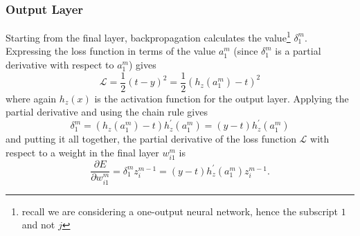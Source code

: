 \documentclass[../main.tex]{subfiles}
\begin{document}
\subsubsection{Output Layer}
Starting from the final layer, backpropagation calculates the
value\footnote{recall we are considering a one-output neural network, hence the
subscript $1$ and not $j$} $\delta_{1}^{m}$.
%
Expressing the loss function in terms of the value $a_{1}^{m}$ (since
$\delta_{1}^{m}$ is a partial derivative with respect to $a_{1}^{m}$) gives
%
\begin{equation}
  \mathcal{L} = \frac{1}{2} {(t - y)}^{2} = \frac{1}{2} {\left(h_{z}(a_{1}^{m})
    - t\right)}^{2} 
\end{equation}
%
where again $h_{z}(x)$ is the activation function for the output layer.
%
Applying the partial derivative and using the chain rule gives
%
\begin{equation}
  \delta_{1}^{m} = {\left(h_{z}(a_{1}^{m}) - t\right)}
    h_{z}^{\prime}(a_{1}^{m}) = (y - t) h_{z}^{\prime}(a_{1}^{m})
\end{equation}
%
and putting it all together, the partial derivative of the loss function
$\mathcal{L}$ with respect to a weight in the final layer $w_{i1}^{m}$ is
%
\begin{equation}
  \frac{\partial E}{\partial w_{i1}^{m}} = \delta_{1}^{m} z_{i}^{m-1} = (y - t)
    h_{z}^{\prime}(a_{1}^{m}) z_{i}^{m-1}.
\label{eq:output_layer}
\end{equation}
\end{document}
